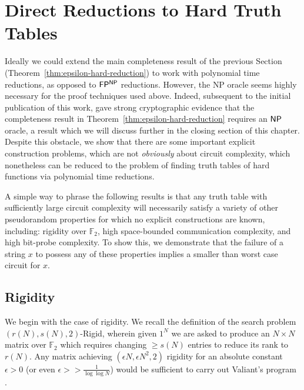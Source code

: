 \section{Direct Reductions to Hard Truth Tables}\label{range:sec:direct-reductions-hard-truth-tables}
Ideally we could extend the main completeness result of the previous Section (Theorem~\ref{thm:epsilon-hard-reduction}) to work with polynomial time reductions, as opposed to $\cl{FP^{NP}}$ reductions. However, the {\cl NP} oracle seems highly necessary for the proof techniques used above. Indeed, subsequent to the initial publication of this work, \cite{ILW} gave strong cryptographic evidence that the completeness result in Theorem~\ref{thm:epsilon-hard-reduction} requires an $\cl{NP}$ oracle, a result which we will discuss further in the closing section of this chapter. Despite this obstacle, we show that there are some important explicit construction problems, which are not \emph{obviously} about circuit complexity, which nonetheless can be reduced to the problem of finding truth tables of hard functions via polynomial time reductions. 

A simple way to phrase the following results is that any truth table with sufficiently large circuit complexity will necessarily satisfy a variety of other pseudorandom properties for which no explicit constructions are known, including: rigidity over $\mathbb{F}_2$, high space-bounded communication complexity, and high bit-probe complexity. To show this, we demonstrate that the failure of a string $x$ to possess any of these properties implies a smaller than worst case circuit for $x$. 


\subsection{Rigidity}\label{range:subsec:rigidity-direct-reduction}
We begin with the case of rigidity. We recall the definition of the search problem  {\sc $(r(N), s(N), 2)$-Rigid}, wherein given $1^N$ we are asked to produce an $N \times N$ matrix over $\mathbb{F}_2$ which requires changing $\geq s(N)$ entries to reduce its rank to $r(N)$. Any matrix achieving $(\epsilon N, \epsilon N^2,2)$ rigidity for an absolute constant $\epsilon >0$ (or even $\epsilon >> \frac{1}{\log \log N}$) would be sufficient to carry out Valiant's program \cite{Valiant}.

